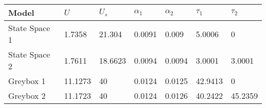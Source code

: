 \begin{tabular}{lllllll}
Model & $U$ & $U_s$ & $\alpha_1$ & $\alpha_2$ & $\tau_1$ & $\tau_2$ \\ 
\hline 
State Space 1 & 1.7358 & 21.304 & 0.0091 & 0.009 & 5.0006 & 0 \\ 
State Space 2 & 1.7611 & 18.6623 & 0.0094 & 0.0094 & 3.0001 & 3.0001 \\ 
Greybox 1 & 11.1273 & 40 & 0.0124 & 0.0125 & 42.9413 & 0 \\ 
Greybox 2 & 11.1723 & 40 & 0.0124 & 0.0126 & 40.2422 & 45.2359 \\ 
\hline 
\end{tabular}